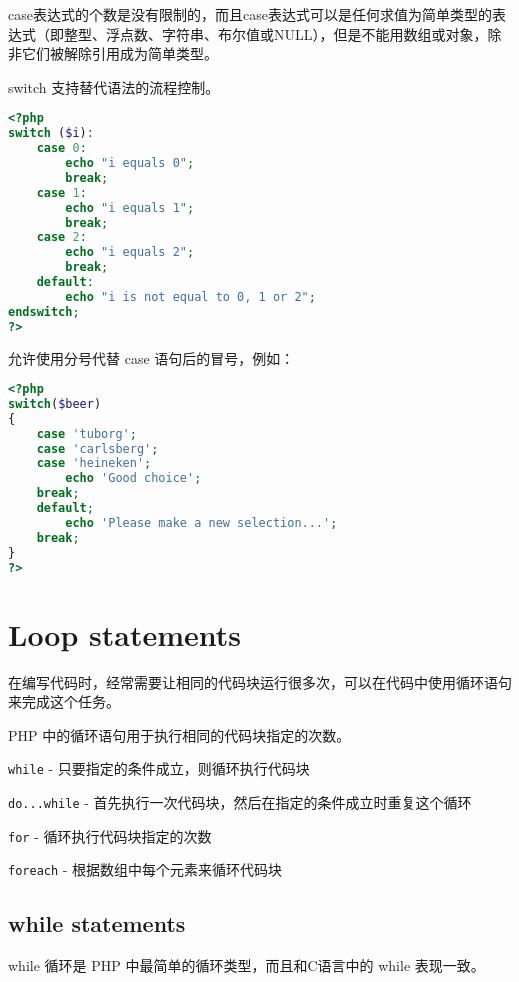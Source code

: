 case表达式的个数是没有限制的，而且case表达式可以是任何求值为简单类型的表达式（即整型、浮点数、字符串、布尔值或NULL），但是不能用数组或对象，除非它们被解除引用成为简单类型。

switch 支持替代语法的流程控制。

\begin{lstlisting}[language=PHP]
<?php
switch ($i):
    case 0:
        echo "i equals 0";
        break;
    case 1:
        echo "i equals 1";
        break;
    case 2:
        echo "i equals 2";
        break;
    default:
        echo "i is not equal to 0, 1 or 2";
endswitch;
?>
\end{lstlisting}


允许使用分号代替 case 语句后的冒号，例如：

\begin{lstlisting}[language=PHP]
<?php
switch($beer)
{
    case 'tuborg';
    case 'carlsberg';
    case 'heineken';
        echo 'Good choice';
    break;
    default;
        echo 'Please make a new selection...';
    break;
}
?>
\end{lstlisting}

\section{Loop statements}



在编写代码时，经常需要让相同的代码块运行很多次，可以在代码中使用循环语句来完成这个任务。


PHP 中的循环语句用于执行相同的代码块指定的次数。


\begin{compactitem}
\item \texttt{while} - 只要指定的条件成立，则循环执行代码块
\item \texttt{do...while} - 首先执行一次代码块，然后在指定的条件成立时重复这个循环
\item \texttt{for} - 循环执行代码块指定的次数
\item \texttt{foreach} - 根据数组中每个元素来循环代码块
\end{compactitem}



\subsection{while statements}

while 循环是 PHP 中最简单的循环类型，而且和C语言中的 while 表现一致。

